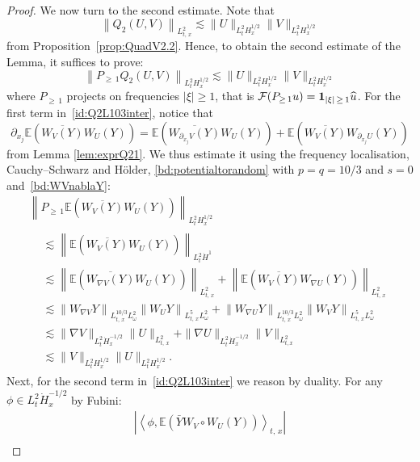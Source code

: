 \documentclass[AHL, Unicode, longabstracts,published]{cedram}
\newcommand{\E}{\mathbb{E}}
\newcommand{\mclF}{\mathcal{F}}
\newcommand{\bfun}{\mathbf{1}}
\let\oldhat\hat
\renewcommand*{\hat}[1]{\mathchoice{\widehat{#1}}{\widehat{#1}}{\oldhat{#1}}{\oldhat{#1}}}
\begin{document}
\begin{proof}
We now turn to the second estimate. Note that
\[
\left\|Q_2(U,V)\right\|_{L^{2}_{t,\,x}} \lesssim \|U\|_{L^2_{t}H^{1/2}_x} \|V\|_{L^2_{t}H^{1/2}_x}
\]
from Proposition~\ref{prop:QuadV2.2}. Hence, to obtain the second estimate of the Lemma, it suffices to prove:
\begin{equation} \label{bd:intermediateQ2highreg}
\left\|P_{\geq\,1}Q_2(U,V)\right\|_{L^{2}_{t}H^{1/2}_x} \lesssim \|U\|_{L^2_{t}H^{1/2}_x} \|V\|_{L^2_{t}H^{1/2}_x}
\end{equation}
where $P_{\geq\,1}$ projects on frequencies $|\xi|\geq1$, that is $\mclF(P_{\geq\,1}u)=\bfun_{|\xi|\,\geq \,1}\hat u$. For the first term in~\eqref{id:Q2L103inter}, notice that
\[
\partial_{x_j}\E \left(\overline{W_V(Y)}W_U(Y)\right)=\E \left(\overline{W_{\partial_{x_j}V}(Y)}W_{U}(Y)\right)+\E \left(\overline{W_{V}(Y)}W_{\partial_{x_j}U}(Y)\right)
\]
from Lemma \eqref{lem:exprQ21}. We thus estimate it using the frequency localisation, Cauchy--Schwarz and H\"older, \eqref{bd:potentialtorandom} with $p=q=10/3$ and $s=0$ and~\eqref{bd:WVnablaY}:
\begin{multline}\label{bd:WVWUinter2}
\left\| P_{\geq\,1}\E \left(\overline{W_{V}(Y)}W_U(Y)\right)\right\|_{L^2_t H^{1/2}_x}\\
\begin{aligned}
&\lesssim \left\| \E \left(\overline{W_{V}(Y)}W_U(Y)\right)\right\|_{L^2_t \dot H^{1}}\\
&\lesssim \left\| \E \left(\overline{W_{\nabla V}(Y)}W_U(Y)\right)\right\|_{L^2_{t,\,x}}+\left\| \E \left(\overline{W_{V}(Y)}W_{\nabla U}(Y)\right)\right\|_{L^2_{t,\,x}}\\
&\lesssim \left\| W_{\nabla V} Y \right\|_{L^{10/3}_{t,\,x}L^2_\omega }\left\| W_{U} Y \right\|_{L^{5}_{t,\,x}L^2_\omega }+\left\| W_{\nabla U} Y \right\|_{L^{10/3}_{t,\,x}L^2_\omega }\left\| W_{V} Y \right\|_{L^{5}_{t,\,x}L^2_\omega } \\
&\lesssim \| \nabla V \|_{L^2_t\dot H^{-1/2}_x }\| U \|_{L^2_{t,\,x}}+ \| \nabla U \|_{L^2_t\dot H^{-1/2}_x }\| V \|_{L^2_{t,x}}\\
&\lesssim \| V \|_{L^2_tH^{1/2}_x}\| U \|_{L^2_{t}H^{1/2}_x}.
\end{aligned}
\end{multline}
Next, for the second term in~\eqref{id:Q2L103inter} we reason by duality. For any $\phi \in L^2_t\dot H^{-1/2}_x$ by Fubini:
\begin{multline*}
\left|\left\langle \phi, \E\left(\bar Y W_V\circ W_U(Y)\right)\right\rangle_{t,\,x}\right|\\

\end{multline*}
\end{proof}
\end{document}
